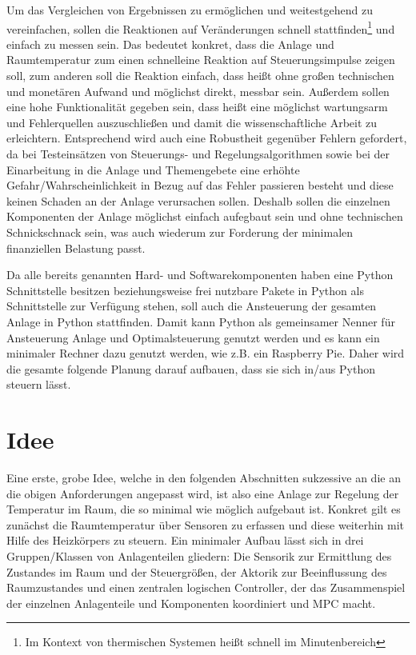 Um das Vergleichen von Ergebnissen zu ermöglichen und weitestgehend zu vereinfachen, sollen die Reaktionen auf Veränderungen schnell stattfinden\footnote{Im Kontext von thermischen Systemen heißt schnell im Minutenbereich} und einfach zu messen sein. Das bedeutet konkret, dass die Anlage und Raumtemperatur zum einen \Gun schnell\Gob eine Reaktion auf Steuerungsimpulse zeigen soll, zum anderen soll die Reaktion einfach, dass heißt ohne großen technischen und monetären Aufwand und möglichst direkt, messbar sein. 
Außerdem sollen eine hohe Funktionalität gegeben sein, dass heißt eine möglichst wartungsarm und Fehlerquellen auszuschließen und damit die wissenschaftliche Arbeit zu erleichtern. Entsprechend wird auch eine Robustheit gegenüber Fehlern gefordert, da bei Testeinsätzen von Steuerungs- und Regelungsalgorithmen sowie bei der Einarbeitung in die Anlage und Themengebete eine erhöhte Gefahr/Wahrscheinlichkeit in Bezug auf das Fehler passieren besteht und diese keinen Schaden an der Anlage verursachen sollen. Deshalb sollen die einzelnen Komponenten der Anlage möglichst einfach aufegbaut sein und ohne technischen Schnickschnack sein, was auch wiederum zur Forderung der minimalen finanziellen Belastung passt.

Da alle bereits genannten Hard- und Softwarekomponenten haben eine Python Schnittstelle besitzen beziehungsweise frei nutzbare Pakete in Python als Schnittstelle zur Verfügung stehen, soll auch die Ansteuerung der gesamten Anlage in Python stattfinden. Damit kann Python als gemeinsamer Nenner für Ansteuerung Anlage und Optimalsteuerung genutzt werden und es kann ein minimaler Rechner dazu genutzt werden, wie z.B. ein Raspberry Pie. Daher wird die gesamte folgende Planung darauf aufbauen, dass sie sich in/aus Python steuern lässt.


\section{Idee}

Eine erste, grobe Idee, welche in den folgenden Abschnitten sukzessive an die an die obigen Anforderungen angepasst wird, ist also eine Anlage zur Regelung der Temperatur im Raum, die so minimal wie möglich aufgebaut ist. Konkret gilt es zunächst die Raumtemperatur über Sensoren zu erfassen und diese weiterhin mit Hilfe des Heizkörpers zu steuern. Ein minimaler Aufbau lässt sich in drei Gruppen/Klassen von Anlagenteilen gliedern: Die Sensorik zur Ermittlung des Zustandes im Raum und der Steuergrößen, der Aktorik zur Beeinflussung des Raumzustandes und einen zentralen logischen Controller, der das Zusammenspiel der einzelnen Anlagenteile und Komponenten koordiniert und MPC macht.

